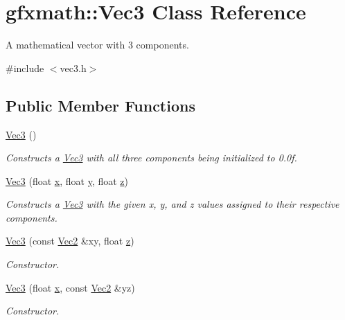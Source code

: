 \hypertarget{classgfxmath_1_1_vec3}{}\section{gfxmath\+:\+:Vec3 Class Reference}
\label{classgfxmath_1_1_vec3}


A mathematical vector with 3 components.  




{\ttfamily \#include $<$vec3.\+h$>$}

\subsection*{Public Member Functions}
\begin{DoxyCompactItemize}
\item 
\hyperlink{classgfxmath_1_1_vec3_a7ef06d33252e5c50c249d06eb1363700}{Vec3} ()
\begin{DoxyCompactList}\small\item\em Constructs a \hyperlink{classgfxmath_1_1_vec3}{Vec3} with all three components being initialized to 0.\+0f. \end{DoxyCompactList}\item 
\hyperlink{classgfxmath_1_1_vec3_a9eed21b7873f58760d6a8751e9972617}{Vec3} (float \hyperlink{classgfxmath_1_1_vec3_adb7cecf3b6d25eecf3924583f41d8c3a}{x}, float \hyperlink{classgfxmath_1_1_vec3_a398bee406395fdc1ad381f5b70d7fd99}{y}, float \hyperlink{classgfxmath_1_1_vec3_a93c1920712889d4f10520c7dc76a79c7}{z})
\begin{DoxyCompactList}\small\item\em Constructs a \hyperlink{classgfxmath_1_1_vec3}{Vec3} with the given x, y, and z values assigned to their respective components. \end{DoxyCompactList}\item 
\hyperlink{classgfxmath_1_1_vec3_a5e51e927f3867e99d09ba451a51c0435}{Vec3} (const \hyperlink{classgfxmath_1_1_vec2}{Vec2} \&xy, float \hyperlink{classgfxmath_1_1_vec3_a93c1920712889d4f10520c7dc76a79c7}{z})
\begin{DoxyCompactList}\small\item\em Constructor. \end{DoxyCompactList}\item 
\hyperlink{classgfxmath_1_1_vec3_abed154f883720d6cb93efa9f111f93b6}{Vec3} (float \hyperlink{classgfxmath_1_1_vec3_adb7cecf3b6d25eecf3924583f41d8c3a}{x}, const \hyperlink{classgfxmath_1_1_vec2}{Vec2} \&yz)
\begin{DoxyCompactList}\small\item\em Constructor. \end{DoxyCompactList}\item 

\end{DoxyCompactItemize}
